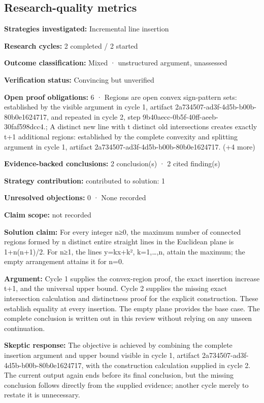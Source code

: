 \documentclass[11pt]{article}
\begin{document}
\subsection{Research-quality metrics}
\textbf{Strategies investigated:} Incremental line insertion\par
\textbf{Research cycles:} 2 completed / 2 started\par
\textbf{Outcome classification:} Mixed · unstructured argument, unassessed\par
\textbf{Verification status:} Convincing but unverified\par
\textbf{Open proof obligations:} 6 · Regions are open convex sign-pattern sets: established by the visible argument in cycle 1, artifact 2a734507-ad3f-4d5b-b00b-80b0e1624717, and repeated in cycle 2, step 9b40aecc-0b5f-40ff-aeeb-30faf598dcc4.; A distinct new line with t distinct old intersections creates exactly t+1 additional regions: established by the complete convexity and splitting argument in cycle 1, artifact 2a734507-ad3f-4d5b-b00b-80b0e1624717. (+4 more)\par
\textbf{Evidence-backed conclusions:} 2 conclusion(s) · 2 cited finding(s)\par
\textbf{Strategy contribution:} contributed to solution: 1\par
\textbf{Unresolved objections:} 0 · None recorded\par
\textbf{Claim scope:} not recorded\par
\textbf{Solution claim:} For every integer n≥0, the maximum number of connected regions formed by n distinct entire straight lines in the Euclidean plane is 1+n(n+1)/2. For n≥1, the lines y=kx+k², k=1,…,n, attain the maximum; the empty arrangement attains it for n=0.\par
\textbf{Argument:} Cycle 1 supplies the convex-region proof, the exact insertion increase t+1, and the universal upper bound. Cycle 2 supplies the missing exact intersection calculation and distinctness proof for the explicit construction. These establish equality at every insertion. The empty plane provides the base case. The complete conclusion is written out in this review without relying on any unseen continuation.\par
\textbf{Skeptic response:} The objective is achieved by combining the complete insertion argument and upper bound visible in cycle 1, artifact 2a734507-ad3f-4d5b-b00b-80b0e1624717, with the construction calculation supplied in cycle 2. The current output again ends before its final conclusion, but the missing conclusion follows directly from the supplied evidence; another cycle merely to restate it is unnecessary.
\end{document}
